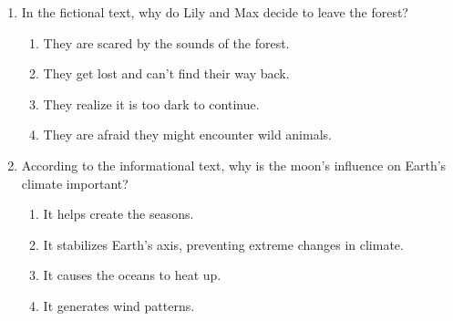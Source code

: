 \documentclass[12pt]{article}
\begin{document}
\begin{enumerate}
\vspace{0.5cm}

\item In the fictional text, why do Lily and Max decide to leave the forest?
\begin{enumerate}[label=\Alph*.]
    \item They are scared by the sounds of the forest.
    \item They get lost and can't find their way back.
    \item They realize it is too dark to continue.
    \item They are afraid they might encounter wild animals.
\end{enumerate}

\vspace{0.5cm}

\item According to the informational text, why is the moon’s influence on Earth’s climate important?
\begin{enumerate}[label=\Alph*.]
    \item It helps create the seasons.
    \item It stabilizes Earth’s axis, preventing extreme changes in climate.
    \item It causes the oceans to heat up.
    \item It generates wind patterns.
\end{enumerate}

\end{enumerate}
\end{document}

